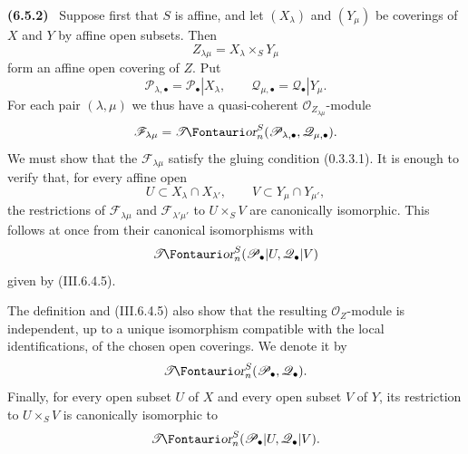 \documentclass[10pt,oneside]{book}
\newcommand{\sh}[1]{\mathscr{#1}}
\newcommand{\shTor}{\sh{T}\textup{\kern-2.2pt{\Fontauri\slshape or}}}
\newcommand{\sref}[2][]{(#2)}
\newcommand{\oldpage}[2][]{\setcounter{footnote}{0}\marginpar{\scriptsize\textbf{#1}~|~#2}\ignorespaces}
\newenvironment{env}[1][]{\par\medskip\noindent\textbf{(#1)}\ }{\par}
\begin{document}
\begin{env}[6.5.2]
\label{III.6.5.2}
Suppose first that $S$ is affine, and let $(X_\lambda)$ and
$(Y_\mu)$ be coverings of $X$ and $Y$ by affine open subsets.
Then
\[
  Z_{\lambda\mu}=X_\lambda\times_SY_\mu
\]
form an affine open covering of $Z$.  Put
\[
  \sh P_{\lambda,\bullet}=\sh P_\bullet|X_\lambda,
  \qquad
  \sh Q_{\mu,\bullet}=\sh Q_\bullet|Y_\mu.
\]
For each pair $(\lambda,\mu)$ we thus have a quasi-coherent
$\sh O_{Z_{\lambda\mu}}$-module
\[
  \sh F_{\lambda\mu}
  =
  \shTor_n^S(\sh P_{\lambda,\bullet},\sh Q_{\mu,\bullet}).
\]
We must show that the $\sh F_{\lambda\mu}$ satisfy the gluing
condition \sref[0]{0.3.3.1}.  It is enough to verify that, for
every affine open
\[
  U\subset X_\lambda\cap X_{\lambda'},
  \qquad
  V\subset Y_\mu\cap Y_{\mu'},
\]
the restrictions of $\sh F_{\lambda\mu}$ and
$\sh F_{\lambda'\mu'}$ to $U\times_SV$ are canonically
isomorphic.  This follows at once from their canonical
isomorphisms with
\[
  \shTor_n^S(\sh P_\bullet|U,\sh Q_\bullet|V)
\]
given by \sref{III.6.4.5}.

The definition and \sref{III.6.4.5} also show that the resulting
$\sh O_Z$-module is independent, up to a unique isomorphism
compatible with the local identifications, of the chosen open
coverings.  We denote it by
\oldpage[III]{149}
\[
  \shTor_n^S(\sh P_\bullet,\sh Q_\bullet).
\]
Finally, for every open subset $U$ of $X$ and every open subset
$V$ of $Y$, its restriction to $U\times_SV$ is canonically
isomorphic to
\[
  \shTor_n^S(\sh P_\bullet|U,\sh Q_\bullet|V).
\]
\end{env}
\end{document}
